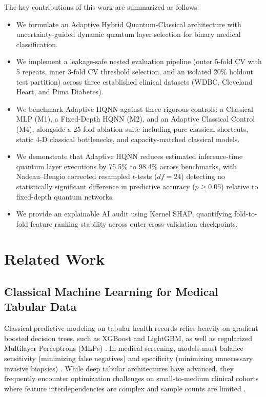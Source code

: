 \documentclass[conference]{IEEEtran}
\begin{document}
The key contributions of this work are summarized as follows:
\begin{itemize}
    \item We formulate an Adaptive Hybrid Quantum-Classical architecture with uncertainty-guided dynamic quantum layer selection for binary medical classification.
    \item We implement a leakage-safe nested evaluation pipeline (outer 5-fold CV with 5 repeats, inner 3-fold CV threshold selection, and an isolated 20\% holdout test partition) across three established clinical datasets (WDBC, Cleveland Heart, and Pima Diabetes).
    \item We benchmark Adaptive HQNN against three rigorous controls: a Classical MLP (M1), a Fixed-Depth HQNN (M2), and an Adaptive Classical Control (M4), alongside a 25-fold ablation suite including pure classical shortcuts, static 4-D classical bottlenecks, and capacity-matched classical models.
    \item We demonstrate that Adaptive HQNN reduces estimated inference-time quantum layer executions by 75.5\% to 98.4\% across benchmarks, with Nadeau--Bengio corrected resampled $t$-tests ($df=24$) detecting no statistically significant difference in predictive accuracy ($p \ge 0.05$) relative to fixed-depth quantum networks.
    \item We provide an explainable AI audit using Kernel SHAP, quantifying fold-to-fold feature ranking stability across outer cross-validation checkpoints.
\end{itemize}

\section{Related Work}

\subsection{Classical Machine Learning for Medical Tabular Data}
Classical predictive modeling on tabular health records relies heavily on gradient boosted decision trees, such as XGBoost \cite{chen2016xgboost} and LightGBM, as well as regularized Multilayer Perceptrons (MLPs) \cite{gorishniy2021revisiting}. In medical screening, models must balance sensitivity (minimizing false negatives) and specificity (minimizing unnecessary invasive biopsies) \cite{street1993nuclear, detrano1989international, smith1988using}. While deep tabular architectures have advanced, they frequently encounter optimization challenges on small-to-medium clinical cohorts where feature interdependencies are complex and sample counts are limited \cite{gorishniy2021revisiting}.
\end{document}
